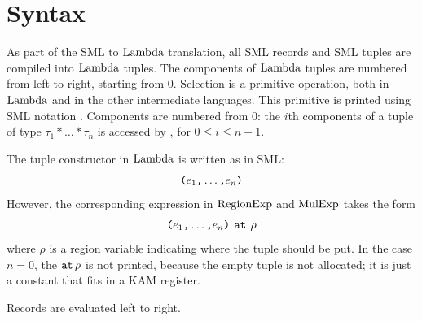 \documentclass[12pt]{book}
\begin{document}
\section{Syntax}
As part of the SML to $\hbox{\rm Lambda}$ translation, all SML records and SML tuples are compiled into
$\hbox{\rm Lambda}$ tuples. The components of $\hbox{\rm Lambda}$ tuples are numbered from left to right, starting from 0.
Selection is a primitive operation, both in $\hbox{\rm Lambda}$ and in the other
intermediate languages. This primitive is printed using SML notation 
. Components are numbered from 0: the $i$th components of
a tuple of type $\tau_1\ast\ldots\ast\tau_n$ is accessed by
, for $0\leq i\leq n-1$. 

The tuple constructor in $\hbox{\rm Lambda}$ is written as in SML:
$$\hbox{\tt (}e_1\hbox{\tt ,}\ldots\hbox{\tt ,}e_n\hbox{\tt )}$$
However, the corresponding expression in $\hbox{\rm RegionExp}$ and $\hbox{\rm MulExp}$ takes the form
$$\hbox{\tt (}e_1\hbox{\tt ,}\ldots\hbox{\tt ,}e_n\hbox{\tt )}\,\mathbin{\hbox{\tt at}}\,\rho$$
where $\rho$ is a region variable indicating where the tuple should be put.
In the case $n=0$,  the $\mathbin{\hbox{\tt at}}\,\rho$ is not printed, because the empty tuple is not
allocated; it is just a constant that fits in a KAM register.

Records are evaluated left to right.
\end{document}
